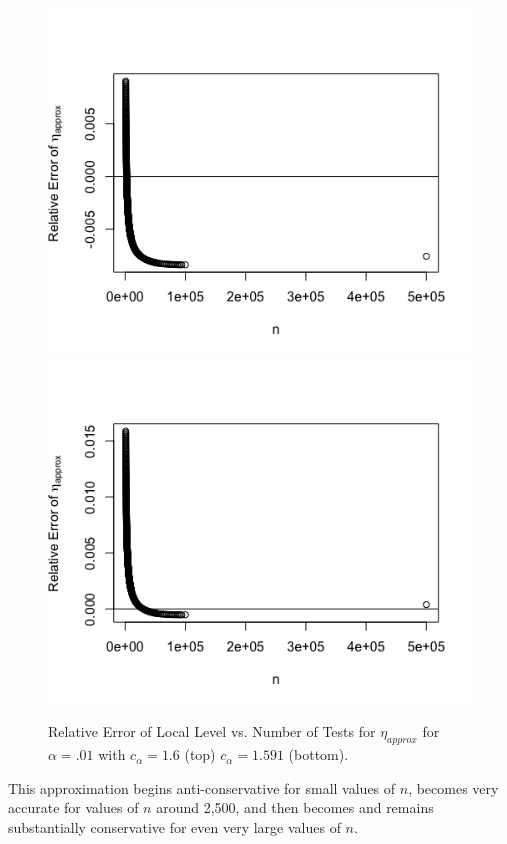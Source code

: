 \documentclass[article]{jss}
\begin{document}
\begin{figure}
\begin{center}
    \includegraphics{images/c_alpha_1_6.png}
    \includegraphics{images/c_alpha_1_591.png}
\end{center}
\caption{Relative Error of Local Level vs. Number of Tests for $\eta_{approx}$ for $\alpha = .01$ with $c_{\alpha} = 1.6$ (top) $c_{\alpha} = 1.591$ (bottom).}
\end{figure}
This approximation begins anti-conservative for small values of $n$, becomes very accurate for values of $n$ around 2,500, and then becomes and remains substantially conservative for even very large values of $n$. 
\end{document}
